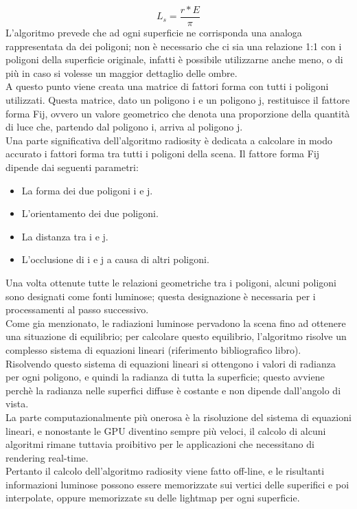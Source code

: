 \begin{equation}
L_s = \frac{r*E}{\pi}
\end{equation}
L’algoritmo prevede che ad ogni superficie ne corrisponda una analoga rappresentata da dei poligoni; non è necessario che ci sia una relazione 1:1 con i poligoni della superficie originale, infatti è possibile utilizzarne anche meno, o di più in caso si volesse un maggior dettaglio delle ombre.
\\
A questo punto viene creata una matrice di fattori forma con tutti i poligoni utilizzati. Questa matrice, dato un poligono i e un poligono j, restituisce il fattore forma Fij, ovvero un valore geometrico che denota una proporzione della quantità di luce che, partendo dal poligono i, arriva al poligono j.
\\
Una parte significativa dell’algoritmo radiosity è dedicata a calcolare in modo accurato i fattori forma tra tutti i poligoni della scena. 
Il fattore forma Fij dipende dai seguenti parametri:
\begin{itemize}
\item La forma dei due poligoni i e j.
\item L’orientamento dei due poligoni.
\item La distanza tra i e j.
\item L’occlusione di i e j a causa di altri poligoni.
\end{itemize}
Una volta ottenute tutte le relazioni geometriche tra i poligoni, alcuni poligoni sono designati come fonti luminose; questa designazione è necessaria per i processamenti al passo successivo.
\\
Come gia menzionato, le radiazioni luminose pervadono la scena fino ad ottenere una situazione di equilibrio; per calcolare questo equilibrio, l’algoritmo risolve un complesso sistema di equazioni lineari (riferimento bibliografico libro).
\\
Risolvendo questo sistema di equazioni lineari si ottengono i valori di radianza per ogni poligono, e quindi la radianza di tutta la superficie; questo avviene perchè la radianza nelle superfici diffuse è costante e non dipende dall’angolo di vista.
\\
La parte computazionalmente più onerosa è la risoluzione del sistema di equazioni lineari, e nonostante le GPU diventino sempre più veloci, il calcolo di alcuni algoritmi rimane tuttavia proibitivo per le applicazioni che necessitano di rendering real-time.
\\
Pertanto il calcolo dell’algoritmo radiosity viene fatto off-line, e le risultanti informazioni luminose possono essere memorizzate sui vertici delle superifici e poi interpolate, oppure memorizzate su delle lightmap per ogni superficie.
